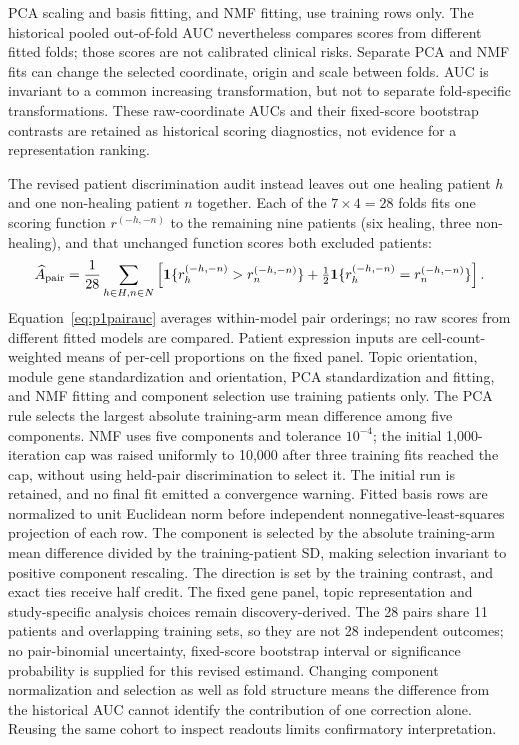 PCA scaling and basis fitting, and NMF fitting, use training rows only. The historical pooled out-of-fold AUC nevertheless compares scores from different fitted folds; those scores are not calibrated clinical risks. Separate PCA and NMF fits can change the selected coordinate, origin and scale between folds. AUC is invariant to a common increasing transformation, but not to separate fold-specific transformations. These raw-coordinate AUCs and their fixed-score bootstrap contrasts are retained as historical scoring diagnostics, not evidence for a representation ranking.

The revised patient discrimination audit instead leaves out one healing patient $h$ and one non-healing patient $n$ together. Each of the $7\times4=28$ folds fits one scoring function $r^{(-h,-n)}$ to the remaining nine patients (six healing, three non-healing), and that unchanged function scores both excluded patients:
\begin{equation}
\widehat A_{\rm pair}=\frac1{28}\sum_{h\in H,n\in N}\left[\mathbf{1}\{r^{(-h,-n)}_h>r^{(-h,-n)}_n\}+\tfrac12\mathbf{1}\{r^{(-h,-n)}_h=r^{(-h,-n)}_n\}\right].\label{eq:p1pairauc}
\end{equation}
Equation~\eqref{eq:p1pairauc} averages within-model pair orderings; no raw scores from different fitted models are compared. Patient expression inputs are cell-count-weighted means of per-cell proportions on the fixed panel. Topic orientation, module gene standardization and orientation, PCA standardization and fitting, and NMF fitting and component selection use training patients only. The PCA rule selects the largest absolute training-arm mean difference among five components. NMF uses five components and tolerance $10^{-4}$; the initial 1,000-iteration cap was raised uniformly to 10,000 after three training fits reached the cap, without using held-pair discrimination to select it. The initial run is retained, and no final fit emitted a convergence warning. Fitted basis rows are normalized to unit Euclidean norm before independent nonnegative-least-squares projection of each row. The component is selected by the absolute training-arm mean difference divided by the training-patient SD, making selection invariant to positive component rescaling. The direction is set by the training contrast, and exact ties receive half credit. The fixed gene panel, topic representation and study-specific analysis choices remain discovery-derived. The 28 pairs share 11 patients and overlapping training sets, so they are not 28 independent outcomes; no pair-binomial uncertainty, fixed-score bootstrap interval or significance probability is supplied for this revised estimand. Changing component normalization and selection as well as fold structure means the difference from the historical AUC cannot identify the contribution of one correction alone. Reusing the same cohort to inspect readouts limits confirmatory interpretation.

